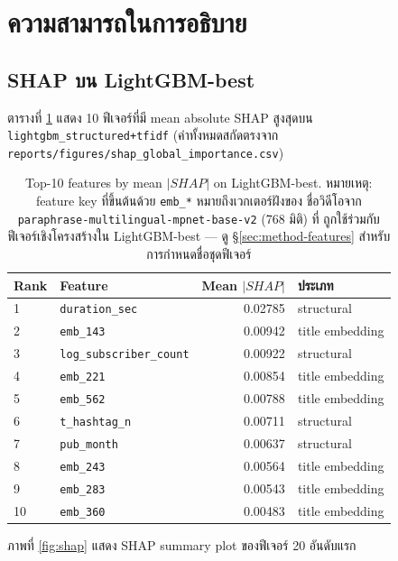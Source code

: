 \section{ความสามารถในการอธิบาย}
\label{sec:results-xai}

\subsection{SHAP บน LightGBM-best}

ตารางที่ \ref{tab:shap-top} แสดง 10 ฟีเจอร์ที่มี mean absolute SHAP สูงสุดบน
\texttt{lightgbm\_structured+tfidf} (ค่าทั้งหมดสกัดตรงจาก
\texttt{reports/figures/shap\_global\_importance.csv})

\begin{table}[H]
\centering
\caption{Top-10 features by mean $|SHAP|$ on LightGBM-best.
หมายเหตุ: feature key ที่ขึ้นต้นด้วย \texttt{emb\_*} หมายถึงเวกเตอร์ฝังของ
ชื่อวิดีโอจาก \texttt{paraphrase-multilingual-mpnet-base-v2} (768 มิติ) ที่
ถูกใช้ร่วมกับฟีเจอร์เชิงโครงสร้างใน LightGBM-best — ดู \S\ref{sec:method-features}
สำหรับการกำหนดชื่อชุดฟีเจอร์}
\label{tab:shap-top}
\begin{tabularx}{\textwidth}{lXrl}
\toprule
\textbf{Rank} & \textbf{Feature} & \textbf{Mean $|SHAP|$} & \textbf{ประเภท} \\
\midrule
1  & \texttt{duration\_sec}            & 0.02785 & structural \\
2  & \texttt{emb\_143}                  & 0.00942 & title embedding \\
3  & \texttt{log\_subscriber\_count}    & 0.00922 & structural \\
4  & \texttt{emb\_221}                  & 0.00854 & title embedding \\
5  & \texttt{emb\_562}                  & 0.00788 & title embedding \\
6  & \texttt{t\_hashtag\_n}             & 0.00711 & structural \\
7  & \texttt{pub\_month}                & 0.00637 & structural \\
8  & \texttt{emb\_243}                  & 0.00564 & title embedding \\
9  & \texttt{emb\_283}                  & 0.00543 & title embedding \\
10 & \texttt{emb\_360}                  & 0.00483 & title embedding \\
\bottomrule
\end{tabularx}
\end{table}

ภาพที่ \ref{fig:shap} แสดง SHAP summary plot ของฟีเจอร์ 20 อันดับแรก

